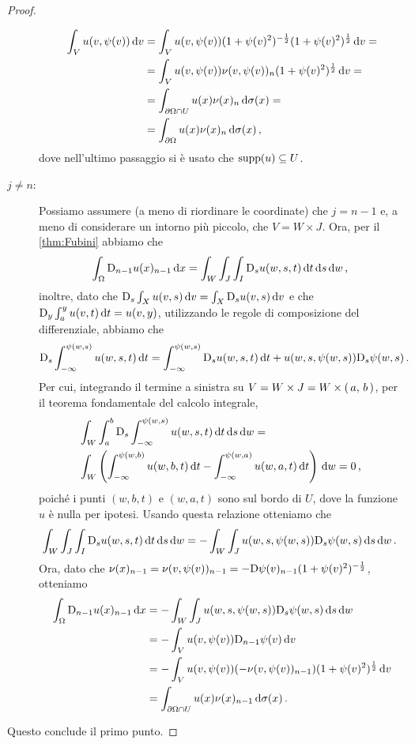 \begin{proof}
\begin{description}
			\begin{align*}
				\int_V u(v,\psi(v)) \,\mathrm d v &= \int_V u(v,\psi(v)) (1+\psi(v)^2)^{-\frac{1}{2}} (1+\psi(v)^2)^{\frac{1}{2}} \,\mathrm d v = \\
				& = \int_V u(v,\psi(v)) \nu(v,\psi(v))_n (1+\psi(v)^2)^{\frac{1}{2}} \,\mathrm d v = \\
				& = \int_{\partial \Omega \cap U} u(x) \nu(x)_n \,\mathrm d \sigma(x) = \\
				& = \int_{\partial \Omega} u(x) \nu(x)_n \,\mathrm d \sigma(x)\, \text{, }
			\end{align*}
			dove nell'ultimo passaggio si è usato che $\operatorname{supp}(u)\subseteq U$.
		\item [$j\neq n$:] Possiamo assumere (a meno di riordinare le coordinate) che $j=n-1$ e, a meno di considerare un intorno più piccolo,
			che $V=W \times J$. Ora, per il \cref{thm:Fubini} abbiamo che
			\[
				\int_{\Omega} \mathrm D_{n-1} u(x)_{n-1} \,\mathrm d x = \int_W \int_J \int_I \mathrm D_s u(w,s,t) \,\mathrm d t \,\mathrm d s \,\mathrm d w\, \text{, }
			\]
			inoltre, dato che $\mathrm D_s \int_X u(v,s)\,\mathrm d v = \int_X \mathrm D_s u(v,s)\,\mathrm d v$ e che $\mathrm D_y \int_a^y u(v,t)\,\mathrm d t=u(v,y)$,
			utilizzando le regole di composizione del differenziale, abbiamo che
			\[
				\mathrm D_s \int_{-\infty}^{\psi(w,s)} u(w,s,t) \,\mathrm d t =
				\int_{-\infty}^{\psi(w,s)} \mathrm D_s u(w,s,t) \,\mathrm d t + u(w,s,\psi(w,s))\mathrm D_s \psi (w,s)\, \text{. }
			\]
			Per cui, integrando il termine a sinistra su $V=W\times J=W\times \left(\,a,\,b\,\right)$, per il teorema fondamentale del
			calcolo integrale,
			\begin{align*}
				&\int_W \int_a^b \mathrm D_s \int_{-\infty}^{\psi(w,s)} u(w,s,t) \,\mathrm d t \,\mathrm d s \,\mathrm d w = \\
				&\int_W \left(\int_{-\infty}^{\psi(w,b)} u(w,b,t) \,\mathrm d t - \int_{-\infty}^{\psi(w,a)} u(w,a,t) \,\mathrm d t\right) \,\mathrm d w
				= 0\, \text{, }
			\end{align*}
			poiché i punti $(w,b,t)$ e $(w,a,t)$ sono sul bordo di $U$, dove la funzione $u$ è nulla per ipotesi. Usando questa relazione
			otteniamo che
			\[
				\int_W\int_J\int_I\mathrm D_s u(w,s,t) \,\mathrm d t \,\mathrm d s \,\mathrm d w =-\int_W \int_J u(w,s,\psi(w,s))\mathrm D_s \psi (w,s)\,\mathrm d s\,\mathrm d w\, \text{. }
			\]
			Ora, dato che $\nu(x)_{n-1}=\nu(v,\psi(v))_{n-1}=-\mathrm D\psi(v)_{n-1}(1+\psi(v)^2)^{-\frac{1}{2}}$, otteniamo
			\begin{align*}
				\int_{\Omega} \mathrm D_{n-1} u(x)_{n-1} \,\mathrm d x & = -\int_W \int_J u(w,s,\psi(w,s))\mathrm D_s \psi (w,s) \,\mathrm d s \,\mathrm d w\\
				& = -\int_V u(v,\psi(v))\mathrm D_{n-1} \psi(v) \,\mathrm d v\\
				& = -\int_V u(v,\psi(v))(-\nu(v,\psi(v))_{n-1})(1+\psi(v)^2)^{\frac{1}{2}} \,\mathrm d v\\
				& = \int_{\partial \Omega \cap U} u(x)\nu(x)_{n-1} \,\mathrm d \sigma(x)\, \text{. }
			\end{align*}
	\end{description}
	Questo conclude il primo punto.
	

\end{proof}
